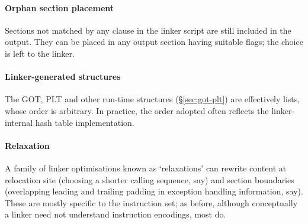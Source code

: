 \documentclass[preprint,10pt]{sigplanconf-pldi16}
\begin{document}
\paragraph{Orphan section placement}
Sections not matched by any clause in the linker script are still included in the output.
They can be placed in any output section having suitable flags; the choice is left to the linker.


\paragraph{Linker-generated structures}
The GOT, PLT and other run-time structures (\S\ref{sec:got-plt}) 
are effectively lists, whose order is arbitrary. 
In practice, the order adopted often reflects the linker-internal hash table implementation.

\paragraph{Relaxation}
A family of linker optimisations known as `relaxations' 
can rewrite content at relocation site (choosing a shorter calling sequence, say) 
and section boundaries (overlapping leading and trailing padding in exception
handling information, say).
These are mostly specific to the instruction set;
as before, although conceptually a linker need not understand instruction encodings, 
most do.
\end{document}
